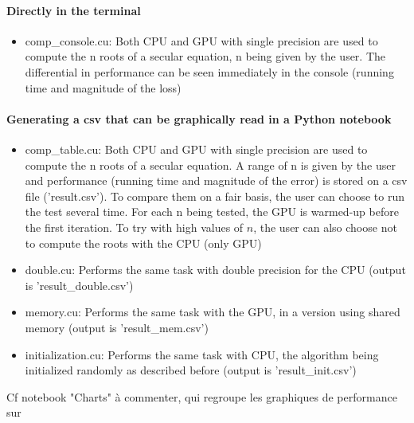 \documentclass[10pt,a4paper]{article}
\begin{document}
\paragraph{Directly in the terminal}
\begin{itemize}
    \item comp\_console.cu: Both CPU and GPU with single precision are used to compute the n roots of a secular equation, n being given by the user. The differential in performance can be seen immediately in the console (running time and magnitude of the loss)

\end{itemize}

\paragraph{Generating a csv that can be graphically read in a Python notebook}
\begin{itemize}
    \item comp\_table.cu: Both CPU and GPU with single precision are used to compute the n roots of a secular equation. A range of n is given by the user and performance (running time and magnitude of the error) is stored on a csv file ('result.csv'). To compare them on a fair basis, the user can choose to run the test several time. For each n being tested, the GPU is warmed-up before the first iteration. To try with high values of $n$, the user can also choose not to compute the roots with the CPU (only GPU)
    \item double.cu: Performs the same task with double precision for the CPU (output is 'result\_double.csv')
    \item memory.cu: Performs the same task with the GPU, in a version using shared memory (output is 'result\_mem.csv')
    \item initialization.cu: Performs the same task with CPU, the algorithm being initialized randomly as described before (output is 'result\_init.csv')
\end{itemize}


Cf notebook "Charts" à commenter, qui regroupe les graphiques de performance sur 


\printbibliography
\end{document}

